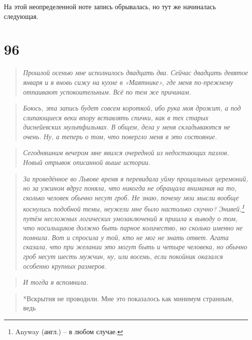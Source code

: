 \documentclass[
  a5paperpaper,
  DIV=11,
  numbers=noendperiod]{scrreprt}
\begin{document}
На этой неопределенной ноте запись обрывалась, но тут же начиналась
следующая.

\section*{96}\label{96}


\begin{quote}
\emph{Прошлой осенью мне исполнилось двадцать два. Сейчас двадцать
девятое января и я вновь сижу на кухне в «Маятнике», где меня
по-прежнему отпаивают успокоительным. Всё по тем же причинам.}
\end{quote}

\begin{quote}
\emph{Боюсь, эта запись будет совсем короткой, ибо рука моя дрожит, а
под слипающиеся веки впору вставлять спички, как в тех старых
диснейевских мультфильмах. В общем, дела у меня складываются не очень.
Ну, а теперь о том, что повергло меня в это состояние.}
\end{quote}

\begin{quote}
\emph{Сегодняшним вечером мне явился очередной из недостающих пазлов.
Новый отрывок описанной выше истории.}
\end{quote}

\begin{quote}
\emph{За проведённое во Львове время я перевидала уйму прощальных
церемоний, но за ужином вдруг поняла, что никогда не обращала внимания
на то, сколько человек обычно несут гроб. Не знаю, почему мои мысли
вообще коснулись подобной темы, неужели мне было настолько скучно?
Энивей,\footnote{Anyway (англ.) -- в любом случае.} путём несложных
логических умозаключений я пришла к выводу о том, что носильщиков должно
быть парное количество, но сколько именно не помнила. Вот и спросила у
той, кто не мог не знать ответ. Агата сказала, что при желании это могут
быть и четыре человека, но обычно гроб несут шесть мужчин, ну, или
восемь, если покойник оказался особенно крупных размеров.}
\end{quote}

\begin{quote}
\emph{И тогда я вспомнила.}
\end{quote}

\begin{quote}
*Вскрытия не проводили. Мне это показалось как минимум странным, ведь
\end{quote}
\end{document}
